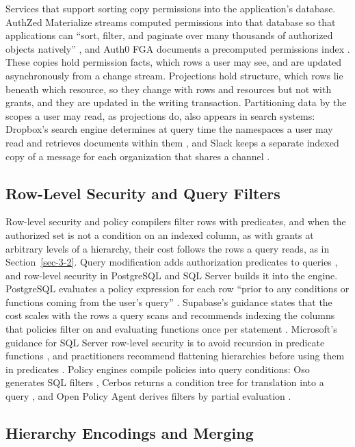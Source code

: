 \documentclass[conference]{IEEEtran}
\begin{document}
Services that support sorting copy permissions into the application's database. AuthZed Materialize streams computed permissions into that database so that applications can ``sort, filter, and paginate over many thousands of authorized objects natively'' \cite{ref24}, and Auth0 FGA documents a precomputed permissions index \cite{ref23}. These copies hold permission facts, which rows a user may see, and are updated asynchronously from a change stream. Projections hold structure, which rows lie beneath which resource, so they change with rows and resources but not with grants, and they are updated in the writing transaction. Partitioning data by the scopes a user may read, as projections do, also appears in search systems: Dropbox's search engine determines at query time the namespaces a user may read and retrieves documents within them \cite{ref25}, and Slack keeps a separate indexed copy of a message for each organization that shares a channel \cite{ref26}.

\subsection{Row-Level Security and Query Filters}\label{sec-8-2}

Row-level security and policy compilers filter rows with predicates, and when the authorized set is not a condition on an indexed column, as with grants at arbitrary levels of a hierarchy, their cost follows the rows a query reads, as in Section~\ref{sec-3-2}. Query modification adds authorization predicates to queries \cite{ref27}, and row-level security in PostgreSQL and SQL Server builds it into the engine. PostgreSQL evaluates a policy expression for each row ``prior to any conditions or functions coming from the user's query'' \cite{ref28}. Supabase's guidance states that the cost scales with the rows a query scans and recommends indexing the columns that policies filter on and evaluating functions once per statement \cite{ref29}. Microsoft's guidance for SQL Server row-level security is to avoid recursion in predicate functions \cite{ref30}, and practitioners recommend flattening hierarchies before using them in predicates \cite{ref31}. Policy engines compile policies into query conditions: Oso generates SQL filters \cite{ref32}, Cerbos returns a condition tree for translation into a query \cite{ref33}, and Open Policy Agent derives filters by partial evaluation \cite{ref34}.

\subsection{Hierarchy Encodings and Merging}\label{sec-8-3}
\end{document}
